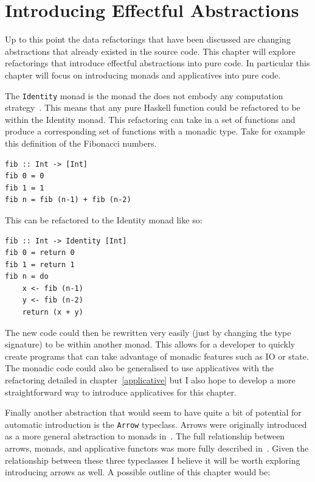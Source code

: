 \chapter{Introducing Effectful Abstractions}\label{chap:monadification}
Up to this point the data refactorings that have been discussed are changing abstractions that already existed in the source code. This chapter will explore refactorings that introduce effectful abstractions into pure code. In particular this chapter will focus on introducing monads and applicatives into pure code.

The \texttt{Identity} monad is the monad the does not embody any computation strategy~\citep{identityMonad}. This means that any pure Haskell function could be refactored to be within the Identity monad. This refactoring can take in a set of functions and produce a corresponding set of functions with a monadic type. Take for example this definition of the Fibonacci numbers.

\begin{lstlisting}[frame=tblr]
fib :: Int -> [Int]
fib 0 = 0
fib 1 = 1
fib n = fib (n-1) + fib (n-2)
\end{lstlisting} 

This can be refactored to the Identity monad like so:\pagebreak

\begin{lstlisting}[frame=tblr]
fib :: Int -> Identity [Int]
fib 0 = return 0
fib 1 = return 1
fib n = do
	x <- fib (n-1)
	y <- fib (n-2)
	return (x + y)
\end{lstlisting}

The new code could then be rewritten very easily (just by changing the type signature) to be within another monad. This allows for a developer to quickly create programs that can take advantage of monadic features such as IO or state. The monadic code could also be generalised to use applicatives with the refactoring detailed in chapter~\ref{applicative} but I also hope to develop a more straightforward way to introduce applicatives for this chapter.

Finally another abstraction that would seem to have quite a bit of potential for automatic introduction is the \texttt{Arrow} typeclass. Arrows were originally introduced as a more general abstraction to monads in~\citep{genMonadsArrows}. The full relationship between arrows, monads, and applicative functors was more fully described in~\citep{arrowsAndIdioms}. Given the relationship between these three typeclasses I believe it will be worth exploring introducing arrows as well. A possible outline of this chapter would be:

